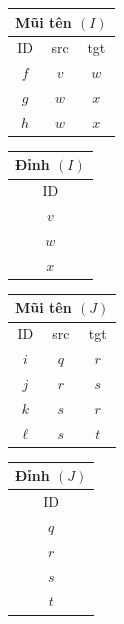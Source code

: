 \begin{center}\small
\begin{tabular}{ccc}\multicolumn{3}{c}{Mũi tên $(I)$}\\\toprule ID&src&tgt\\\midrule$f$&$v$&$w$\\$g$&$w$&$x$\\$h$&$w$&$x$\\\bottomrule\end{tabular}\quad
\begin{tabular}{c}Đỉnh $(I)$\\\toprule ID\\\midrule$v$\\$w$\\$x$\\\bottomrule\end{tabular}\qquad
\begin{tabular}{ccc}\multicolumn{3}{c}{Mũi tên $(J)$}\\\toprule ID&src&tgt\\\midrule$i$&$q$&$r$\\$j$&$r$&$s$\\$k$&$s$&$r$\\$\ell$&$s$&$t$\\\bottomrule\end{tabular}\quad
\begin{tabular}{c}Đỉnh $(J)$\\\toprule ID\\\midrule$q$\\$r$\\$s$\\$t$\\\bottomrule\end{tabular}
\end{center}

